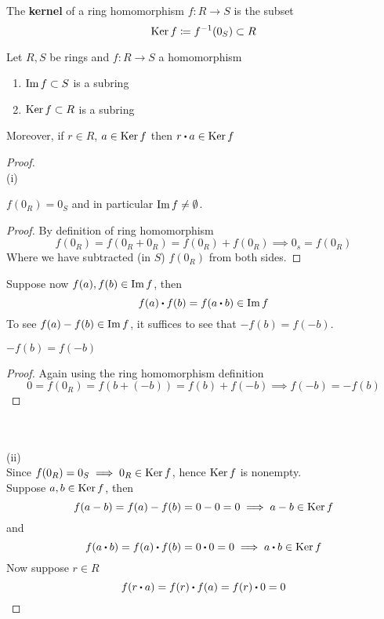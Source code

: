 \documentclass[../Main.tex]{subfiles}
\begin{document}
\begin{dfn}
	The \textbf{kernel} of a ring homomorphism $f: R\to S$ is the subset
	\[\operatorname{Ker} f \coloneqq f^{-1}(0_S)\subset R\]
\end{dfn}
\begin{prop}
	Let $R,S$ be rings and $f: R \to S$ a homomorphism
	\begin{enumerate}
		\item $\operatorname{Im} f \subset S$ is a subring
		\item $\operatorname{Ker} f \subset R$ is a subring
	\end{enumerate}
	Moreover, if $r\in R$, $a\in \operatorname{Ker} f$ then $r\rdot a \in \Ker f$
\end{prop}
\begin{proof}~\\
	(i) \begin{claim}
		$f(0_R) = 0_S$ and in particular $\operatorname{Im} f \ne \emptyset$.
		\begin{proof}
			By definition of ring homomorphism
			\[f(0_R)=f(0_R+0_R)=f(0_R)+f(0_R) \implies 0_s = f(0_R)\]
			Where we have subtracted (in $S$) $f(0_R)$ from both sides.
		\end{proof}
	\end{claim}
	Suppose now $f(a), f(b) \in \operatorname{Im} f$, then
	\[f(a)\rdot f(b) = f(a\rdot b) \in \Img f\]
	To see $f(a)-f(b) \in \operatorname{Im} f$, it suffices to see that $-f(b)=f(-b)$.
	\begin{claim}
		$-f(b)=f(-b)$
	\end{claim}
	\begin{proof}
		Again using the ring homomorphism definition
		\[0=f(0_R)=f(b+(-b))=f(b)+f(-b) \implies f(-b)=-f(b)\]
	\end{proof}~\\~\\
	(ii) ~\\
	Since $f(0_R)=0_S \implies 0_R \in \operatorname{Ker} f$, hence $\operatorname{Ker} f$ is nonempty.\\
	Suppose $a,b\in \operatorname{Ker} f$, then
	\[f(a-b) = f(a)-f(b)=0-0=0 \implies a-b \in \operatorname{Ker} f\]
	and
	\[f(a\rdot b) = f(a)\rdot f(b) = 0\rdot 0 = 0 \implies a\rdot b \in \Ker f\]
	Now suppose $r\in R$
	\[f(r\rdot a)=f(r)\rdot f(a)=f(r)\rdot 0=0\]
\end{proof}
\end{document}

